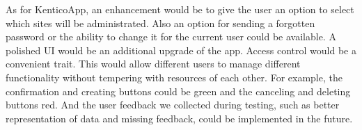 As for KenticoApp, an enhancement would be to give the user an option to select which sites will be administrated. Also an option for sending a forgotten password or the ability to change it for the current user could be available. A polished UI would be an additional upgrade of the app. Access control would be a convenient trait. This would allow different users to manage different functionality without tempering with resources of each other.
For example, the confirmation and creating buttons could be green and the canceling and deleting buttons red. And the user feedback we collected during testing, such as better representation of data and missing feedback, could be implemented in the future.
